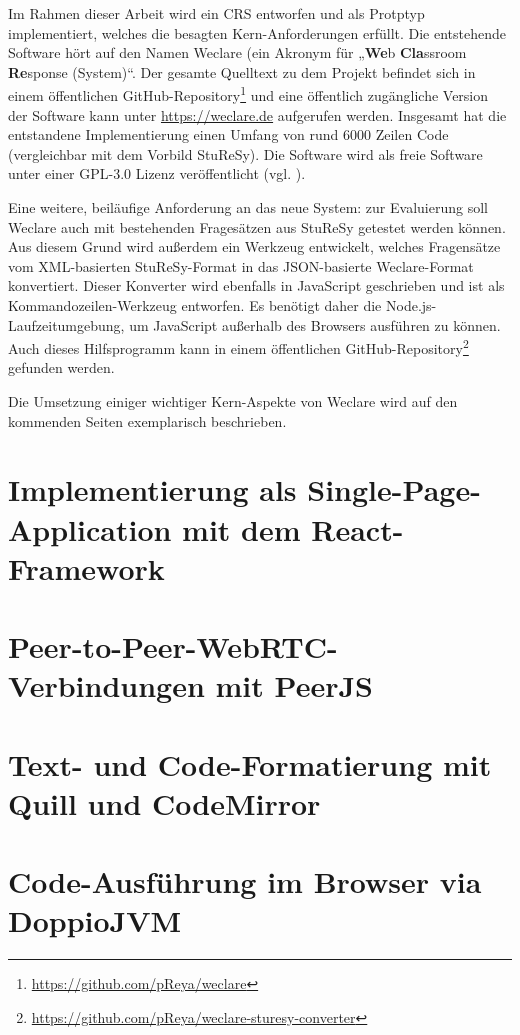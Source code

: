 Im Rahmen dieser Arbeit wird ein CRS entworfen und als Protptyp implementiert, welches die besagten Kern-Anforderungen erfüllt. Die entstehende Software hört auf den Namen Weclare (ein Akronym für „\textbf{We}b \textbf{Cla}ssroom \textbf{Re}sponse (System)“. Der gesamte Quelltext zu dem Projekt befindet sich in einem öffentlichen GitHub-Repository\footnote{\url{https://github.com/pReya/weclare}} und eine öffentlich zugängliche Version der Software kann unter \url{https://weclare.de} aufgerufen werden. Insgesamt hat die entstandene Implementierung einen Umfang von rund 6000 Zeilen Code (vergleichbar mit dem Vorbild StuReSy). Die Software wird als freie Software unter einer GPL-3.0 Lizenz veröffentlicht (vgl. \cite{web:github_weclare_license}).

Eine weitere, beiläufige Anforderung an das neue System: zur Evaluierung soll Weclare auch mit bestehenden Fragesätzen aus StuReSy getestet werden können. Aus diesem Grund wird außerdem ein Werkzeug entwickelt, welches Fragensätze vom XML-basierten StuReSy-Format in das JSON-basierte Weclare-Format konvertiert. Dieser Konverter wird ebenfalls in JavaScript geschrieben und ist als Kommandozeilen-Werkzeug entworfen. Es benötigt daher die Node.js-Laufzeitumgebung, um JavaScript außerhalb des Browsers ausführen zu können. Auch dieses Hilfsprogramm kann in einem öffentlichen GitHub-Repository\footnote{\url{https://github.com/pReya/weclare-sturesy-converter}} gefunden werden. 

Die Umsetzung einiger wichtiger Kern-Aspekte von Weclare wird auf den kommenden Seiten exemplarisch beschrieben.

\newpage
\section{Implementierung als Single-Page-Application mit dem React-Framework}
\label{chap:react_einfuehrung}


\newpage
\section{Peer-to-Peer-WebRTC-Verbindungen mit PeerJS}
\label{chap:p2p}


\newpage
\section{Text- und Code-Formatierung mit Quill und CodeMirror}
\label{chap:formatierung}


\newpage
\section{Code-Ausführung im Browser via DoppioJVM}
\label{chap:ausfuehrung}
